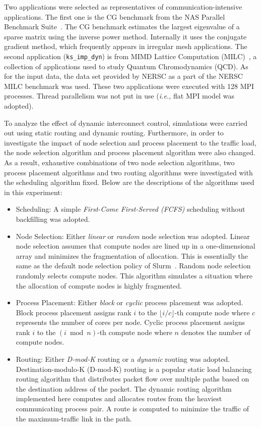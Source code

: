 Two applications were selected as representatives of
communication-intensive applications. The first one is the CG benchmark
from the NAS Parallel Benchmark Suite~\autocite{Bailey1991}. The CG
benchmark estimates the largest eigenvalue of a sparse matrix using the
inverse power method. Internally it uses the conjugate gradient method,
which frequently appears in irregular mesh applications. The second
application (\lstinline!ks_imp_dyn!) is from MIMD
Lattice Computation (MILC)~\autocite{milc}, a collection of applications used
to study Quantum Chromodynamics (QCD). As for the input data, the data set
provided by NERSC as a part of the NERSC MILC benchmark was used. These two
applications were executed with 128 MPI processes. Thread parallelism was not
put in use (\emph{i.e.,} flat MPI model was adopted).

To analyze the effect of dynamic interconnect control, simulations were
carried out using static routing and dynamic routing. Furthermore,
in order to investigate the impact of node selection and process
placement to the traffic load, the node selection algorithm and process
placement algorithm were also changed. As a result, exhaustive
combinations of two node selection algorithms, two process placement
algorithms and two routing algorithms were investigated with the
scheduling algorithm fixed. Below are the descriptions of the algorithms
used in this experiment:

\begin{itemize}
\item
  Scheduling: A simple \emph{First-Come First-Served (FCFS)} scheduling
  without backfilling was adopted.
\item
  Node Selection: Either \emph{linear} or \emph{random} node selection
  was adopted. Linear node selection assumes that compute nodes are
  lined up in a one-dimensional array and minimizes the fragmentation of
  allocation. This is essentially the same as the default node selection
  policy of Slurm~\autocite{Yoo2003}. Random node selection randomly selects
  compute nodes. This algorithm simulates a situation where the allocation of
  compute nodes is highly fragmented.
\item
  Process Placement: Either \emph{block} or \emph{cyclic} process
  placement was adopted. Block process placement assigns rank \(i\) to
  the \(\lfloor i / c \rfloor\)-th compute node where \(c\) represents
  the number of cores per node. Cyclic process placement assigns rank
  \(i\) to the \((i \bmod n)\)-th compute node where \(n\) denotes the
  number of compute nodes.
\item
  Routing: Either \emph{D-mod-K} routing or a \emph{dynamic} routing was
  adopted. Destination-modulo-K (\mbox{D-mod-K}) routing is a
  popular static load balancing routing algorithm that distributes
  packet flow over multiple paths based on the destination address of
  the packet. The dynamic routing algorithm implemented here computes
  and allocates routes from the heaviest communicating process pair. A
  route is computed to minimize the traffic of the maximum-traffic link
  in the path.
\end{itemize}

